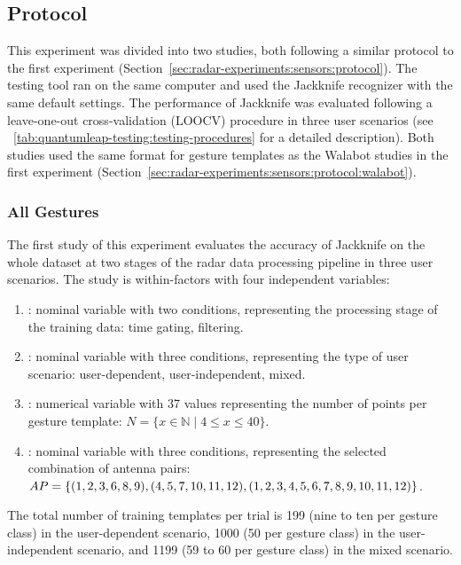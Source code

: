 \subsection{Protocol} \label{sec:radar-experiments:gesture-subsets:protocol}
This experiment was divided into two studies, both following a similar protocol to the first experiment (Section~\ref{sec:radar-experiments:sensors:protocol}). The \ql testing tool ran on the same computer and used the Jackknife recognizer with the same default settings. The performance of Jackknife was evaluated following a leave-one-out cross-validation (LOOCV) procedure in three user scenarios (see \tab~\ref{tab:quantumleap-testing:testing-procedures} for a detailed description). 
Both studies used the same format for gesture templates as the Walabot studies in the first experiment (Section~\ref{sec:radar-experiments:sensors:protocol:walabot}).

\subsubsection{All Gestures} \label{sec:radar-experiments:gesture-subsets:protocol:all-gestures}
The first study of this experiment evaluates the accuracy of Jackknife on the whole dataset at two stages of the radar data processing pipeline in three user scenarios. The study is within-factors with four independent variables:
\begin{enumerate}
    \item {}: nominal variable with two conditions, representing the processing stage of the training data: time gating, filtering.
    \item {}: nominal variable with three conditions, representing the type of user scenario: user-dependent, user-independent, mixed.
    \item {}: numerical variable with 37 values representing the number of points per gesture template: $N{=}\{x\in\mathbb{N} \mid 4 \leq x \leq 40\}$.
    \item {}: nominal variable with three conditions, representing the selected combination of antenna pairs: $\splitatcommas{AP=\{(1, 2, 3, 6, 8, 9), (4, 5, 7, 10, 11, 12), (1, 2, 3, 4, 5, 6, 7, 8, 9, 10, 11, 12)\}}$.
\end{enumerate}
The total number of training templates per trial is 199 (nine to ten per gesture class) in the user-dependent scenario, 1000 (50 per gesture class) in the user-independent scenario, and 1199 (59 to 60 per gesture class) in the mixed scenario.

